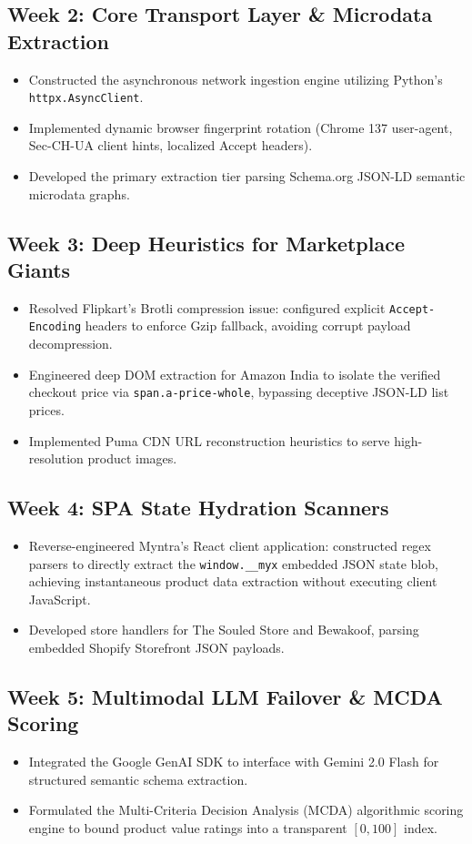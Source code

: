 \documentclass[12pt,a4paper,oneside]{report}
\begin{document}
\subsection{Week 2: Core Transport Layer \& Microdata Extraction}
\begin{itemize}
    \item Constructed the asynchronous network ingestion engine utilizing Python's \texttt{httpx.AsyncClient}.
    \item Implemented dynamic browser fingerprint rotation (Chrome 137 user-agent, Sec-CH-UA client hints, localized Accept headers).
    \item Developed the primary extraction tier parsing Schema.org JSON-LD semantic microdata graphs.
\end{itemize}

\subsection{Week 3: Deep Heuristics for Marketplace Giants}
\begin{itemize}
    \item Resolved Flipkart's Brotli compression issue: configured explicit \texttt{Accept-Encoding} headers to enforce Gzip fallback, avoiding corrupt payload decompression.
    \item Engineered deep DOM extraction for Amazon India to isolate the verified checkout price via \texttt{span.a-price-whole}, bypassing deceptive JSON-LD list prices.
    \item Implemented Puma CDN URL reconstruction heuristics to serve high-resolution product images.
\end{itemize}

\subsection{Week 4: SPA State Hydration Scanners}
\begin{itemize}
    \item Reverse-engineered Myntra's React client application: constructed regex parsers to directly extract the \texttt{window.\_\_myx} embedded JSON state blob, achieving instantaneous product data extraction without executing client JavaScript.
    \item Developed store handlers for The Souled Store and Bewakoof, parsing embedded Shopify Storefront JSON payloads.
\end{itemize}

\subsection{Week 5: Multimodal LLM Failover \& MCDA Scoring}
\begin{itemize}
    \item Integrated the Google GenAI SDK to interface with Gemini 2.0 Flash for structured semantic schema extraction.
    \item Formulated the Multi-Criteria Decision Analysis (MCDA) algorithmic scoring engine to bound product value ratings into a transparent $[0, 100]$ index.
\end{itemize}
\end{document}
